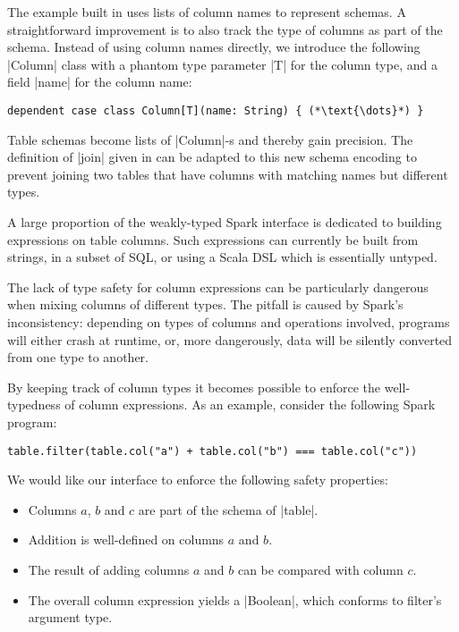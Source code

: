 The example built in  uses lists of column names to represent schemas.
A straightforward improvement is to also track the type of columns as part of the schema.
Instead of using column names directly, we introduce the following |Column| class with a phantom type parameter |T| for the column type, and a field |name| for the column name:

\begin{lstlisting}
dependent case class Column[T](name: String) { (*\text{\dots}*) }
\end{lstlisting}

Table schemas become lists of |Column|-s and thereby gain precision.
The definition of |join| given in  can be adapted to this new schema encoding to prevent joining two tables that have columns with matching names but different types.

A large proportion of the weakly-typed Spark interface is dedicated to building expressions on table columns.
Such expressions can currently be built from strings, in a subset of SQL, or using a Scala DSL which is essentially untyped.

The lack of type safety for column expressions can be particularly dangerous when mixing columns of different types.
The pitfall is caused by Spark's inconsistency: depending on types of columns and operations involved, programs will either crash at runtime, or, more dangerously, data will be silently converted from one type to another.

By keeping track of column types it becomes possible to enforce the well-typedness of column expressions.
As an example, consider the following Spark program:

\begin{lstlisting}
table.filter(table.col("a") + table.col("b") === table.col("c"))
\end{lstlisting}

We would like our interface to enforce the following safety properties:

\begin{itemize}
\item
  Columns $a$, $b$ and $c$ are part of the schema of
  |table|.
\item
  Addition is well-defined on columns $a$ and $b$.
\item
  The result of adding columns $a$ and $b$ can be compared with
  column $c$.
\item
  The overall column expression yields a |Boolean|, which
  conforms to filter's argument type.
\end{itemize}

